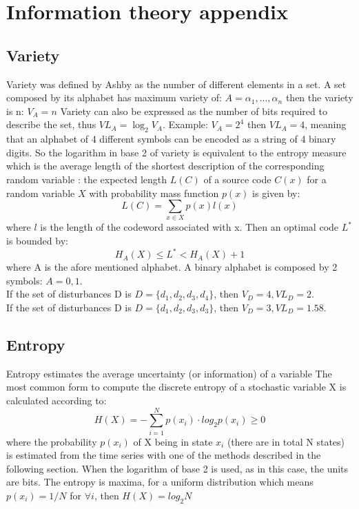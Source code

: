 
\section{Information theory appendix}
\subsection{Variety}
Variety was defined by Ashby as the number of different elements in a set.
A set composed by its alphabet has maximum variety of: $A={\alpha_1,...,\alpha_n}$
then the variety is n: $V_A=n$
Variety can also be expressed as the number of bits required to describe the set,
thus $VL_A=\log_2 V_A$.
Example: $V_A=2^{4}$ then $VL_A=4$, meaning that an alphabet of 4 different
symbols can be encoded as a string of 4 binary digits. So the logarithm in
base 2 of variety is equivalent to the entropy measure which is the average
length of the shortest description of the corresponding random variable
\citep{Shannon76}: the expected length $L(C)$ of a source code $C(x)$ for
a random variable $X$ with probability mass function $p(x)$ is given by:
\begin{equation}
 L(C)=\sum_{x\in X}p(x)l(x)
\end{equation}
where $l$ is the length of the codeword associated with x.
Then an optimal code $L^*$ is bounded by:
\begin{equation}
 H_A(X)\leq L^* < H_A(X)+1
\end{equation}
where A is the afore mentioned alphabet. A binary alphabet is
composed by 2 symbols: $A={0,1}$.\\
If the set of disturbances D is $D=\{ d_1,d_2,d_3,d_4 \}$, then $V_D=4,VL_D=2$.\\
If the set of disturbances D is $D=\{ d_1,d_2,d_3,d_3 \}$, then $V_D=3,VL_D=1.58$.\\

\subsection{Entropy}
Entropy estimates the average uncertainty (or information) of a variable \citep{Shannon76}
The most common form to compute the discrete entropy of a stochastic variable X is calculated according to:
\begin{equation}
 H(X)=-\sum_{i=1}^{N} p(x_{i})\cdot log_2 p(x_i) \geq 0
\end{equation}
where the probability $p(x_i)$ of X being in state $x_i$ (there are in total N states)
is estimated from the time series with one of the methods described in the following section.
When the logarithm of base 2 is used, as in this case, the units are bits.
The entropy is maxima, for a uniform distribution which means
$p(x_{i})=1/N$ for $\forall i$, then $H(X)=log_2 N$

